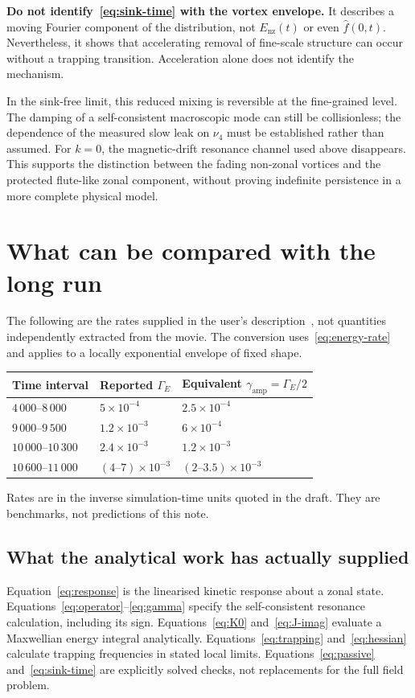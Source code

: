 \documentclass[10pt,a4paper]{article}
\newcommand{\nz}{\mathrm{nz}}
\begin{document}
\begin{tcolorbox}
\textbf{Do not identify~\eqref{eq:sink-time} with the vortex envelope.} It describes a moving Fourier component of the distribution, not $E_\nz(t)$ or even $\widehat f(0,t)$. Nevertheless, it shows that accelerating removal of fine-scale structure can occur without a trapping transition. Acceleration alone does not identify the mechanism.
\end{tcolorbox}
In the sink-free limit, this reduced mixing is reversible at the fine-grained level. The damping of a self-consistent macroscopic mode can still be collisionless; the dependence of the measured slow leak on $\nu_4$ must be established rather than assumed. For $k=0$, the magnetic-drift resonance channel used above disappears. This supports the distinction between the fading non-zonal vortices and the protected flute-like zonal component, without proving indefinite persistence in a more complete physical model.

\newpage
\section{What can be compared with the long run}
The following are the rates supplied in the user's description~\cite{longrun}, not quantities independently extracted from the movie. The conversion uses~\eqref{eq:energy-rate} and applies to a locally exponential envelope of fixed shape.
\begin{center}
\renewcommand{\arraystretch}{1.2}
\begin{tabular}{@{}lll@{}}
\toprule
Time interval & Reported $\Gamma_E$ & Equivalent $\gamma_{\mathrm{amp}}=\Gamma_E/2$\\
\midrule
$4\,000$--$8\,000$   & $5\times10^{-4}$       & $2.5\times10^{-4}$\\
$9\,000$--$9\,500$   & $1.2\times10^{-3}$     & $6\times10^{-4}$\\
$10\,000$--$10\,300$ & $2.4\times10^{-3}$     & $1.2\times10^{-3}$\\
$10\,600$--$11\,000$ & $(4\text{--}7)\times10^{-3}$ & $(2\text{--}3.5)\times10^{-3}$\\
\bottomrule
\end{tabular}
\end{center}
Rates are in the inverse simulation-time units quoted in the draft. They are benchmarks, not predictions of this note.

\subsection{What the analytical work has actually supplied}
Equation~\eqref{eq:response} is the linearised kinetic response about a zonal state. Equations~\eqref{eq:operator}--\eqref{eq:gamma} specify the self-consistent resonance calculation, including its sign. Equations~\eqref{eq:K0} and~\eqref{eq:J-imag} evaluate a Maxwellian energy integral analytically. Equations~\eqref{eq:trapping} and~\eqref{eq:hessian} calculate trapping frequencies in stated local limits. Equations~\eqref{eq:passive} and~\eqref{eq:sink-time} are explicitly solved checks, not replacements for the full field problem.
\end{document}
